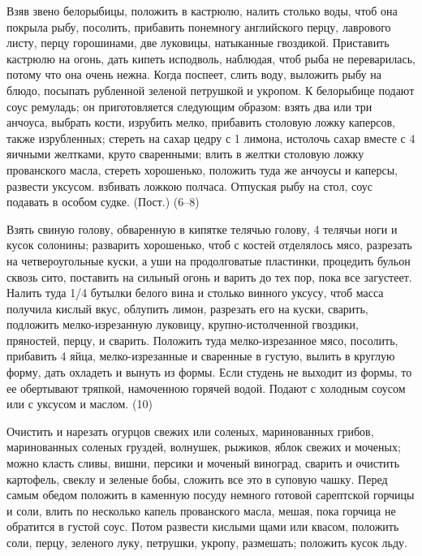 Взяв звено белорыбицы, положить в кастрюлю, налить столько воды, чтоб она покрыла рыбу, посолить, прибавить понемногу английского перцу, лаврового листу, перцу горошинами, две луковицы, натыканные гвоздикой. Приставить кастрюлю на огонь, дать кипеть исподволь, наблюдая, чтоб рыба не переварилась, потому что она очень нежна. Когда поспеет, слить воду, выложить рыбу на блюдо, посыпать рубленной зеленой петрушкой и укропом. К белорыбице подают соус ремуладь; он приготовляется следующим образом: взять два или три анчоуса, выбрать кости, изрубить мелко, прибавить столовую ложку каперсов, также изрубленных; стереть на сахар цедру с 1 лимона, истолочь сахар вместе с 4 яичными желтками, круто сваренными; влить в желтки столовую ложку прованского масла, стереть хорошенько, положить туда же анчоусы и каперсы, развести уксусом. взбивать ложкою полчаса. Отпуская рыбу на стол, соус подавать в особом судке. (Пост.) (6–8)


Взять свиную голову, обваренную в кипятке телячью голову, 4 телячьи ноги и кусок солонины; разварить хорошенько, чтоб с костей отделялось мясо, разрезать на четвероугольные куски, а уши на продолговатые пластинки, процедить бульон сквозь сито, поставить на сильный огонь и варить до тех пор, пока все загустеет. Налить туда 1/4 бутылки белого вина и столько винного уксусу, чтоб масса получила кислый вкус, облупить лимон, разрезать его на куски, сварить, подложить мелко-изрезанную луковицу, крупно-истолченной гвоздики, пряностей, перцу, и сварить. Положить туда мелко-изрезанное мясо, посолить, прибавить 4 яйца, мелко-изрезанные и сваренные в густую, вылить в круглую форму, дать охладеть и вынуть из формы. Если студень не выходит из формы, то ее обертывают тряпкой, намоченною горячей водой. Подают с холодным соусом или с уксусом и маслом. (10)


Очистить и нарезать огурцов свежих или соленых, маринованных грибов, маринованных соленых груздей, волнушек, рыжиков, яблок свежих и моченых; можно класть сливы, вишни, персики и моченый виноград, сварить и очистить картофель, свеклу и зеленые бобы, сложить все это в суповую чашку. Перед самым обедом положить в каменную посуду немного готовой сарептской горчицы и соли, влить по несколько капель прованского масла, мешая, пока горчица не обратится в густой соус. Потом развести кислыми щами или квасом, положить соли, перцу, зеленого луку, петрушки, укропу, размешать; положить кусок льду.

